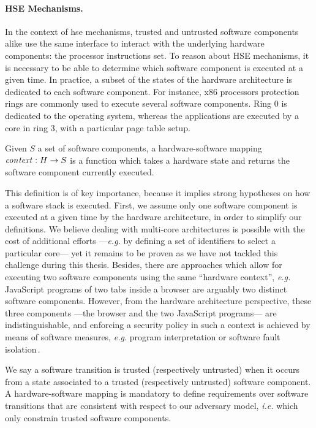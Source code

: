 \paragraph{HSE Mechanisms.}
%
In the context of \ac{hse} mechanisms, trusted and untrusted software components
alike use the same interface to interact with the underlying hardware
components: the processor instructions set.
%
To reason about HSE mechanisms, it is necessary to be able to determine which
software component is executed at a given time.
%
In practice, a subset of the states of the hardware architecture is dedicated to
each software component.
%
For instance, x86 processors protection rings are commonly used to execute
several software components.
%
Ring 0 is dedicated to the operating system, whereas the applications are
executed by a core in ring 3, with a particular page table setup.

\begin{definition}
  \label{def:speccert:hardsoft}
  Given \( S \) a set of software components, a hardware-software mapping
  $\mathit{con\-text} : H \rightarrow S$ is a function which takes a hardware
  state and returns the software component currently executed.
\end{definition}

This definition is of key importance, because it implies strong hypotheses on
how a software stack is executed.
%
First, we assume only one software component is executed at a given time by the
hardware architecture, in order to simplify our definitions.
%
We believe dealing with multi-core architectures is possible with the cost of
additional efforts ---\emph{e.g.} by defining a set of identifiers to select a
particular core--- yet it remains to be proven as we have not tackled this
challenge during this thesis.
%
Besides, there are approaches which allow for executing two software components
using the same ``hardware context'', \emph{e.g.} JavaScript programs of two tabs
inside a browser are arguably two distinct software components.
%
However, from the hardware architecture perspective, these three components
---the browser and the two JavaScript programs--- are indistinguishable, and
enforcing a security policy in such a context is achieved by means of software
measures, \emph{e.g.} program interpretation or software fault
isolation\,\cite{morrisett2012rocksalt}.

We say a software transition is trusted (respectively untrusted) when it occurs
from a state associated to a trusted (respectively untrusted) software
component.
%
A hardware-software mapping is mandatory to define requirements over software
transitions that are consistent with respect to our adversary model, \emph{i.e.}
which only constrain trusted software components.

